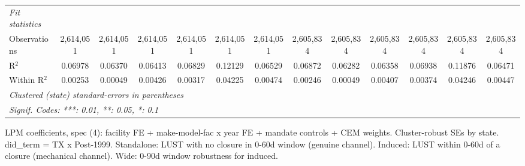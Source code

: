 \begin{tabular}{lcccccccccccc}
   \midrule
   \emph{Fit statistics}\\
   Observations                    & 2,614,051       & 2,614,051         & 2,614,051                & 2,614,051                     & 2,614,051              & 2,614,051                          & 2,605,834       & 2,605,834         & 2,605,834                & 2,605,834                     & 2,605,834              & 2,605,834\\  
   R$^2$                           & 0.06978         & 0.06370           & 0.06413                  & 0.06829                       & 0.12129                & 0.06529                            & 0.06872         & 0.06282           & 0.06358                  & 0.06938                       & 0.11876                & 0.06471\\  
   Within R$^2$                    & 0.00253         & 0.00049           & 0.00426                  & 0.00317                       & 0.04225                & 0.00474                            & 0.00246         & 0.00049           & 0.00407                  & 0.00374                       & 0.04246                & 0.00447\\  
   \midrule \midrule
   \multicolumn{13}{l}{\emph{Clustered (state) standard-errors in parentheses}}\\
   \multicolumn{13}{l}{\emph{Signif. Codes: ***: 0.01, **: 0.05, *: 0.1}}\\
\end{tabular}
 
\par \raggedright 
LPM coefficients, spec (4): facility FE + make-model-fac x year FE + mandate controls + CEM weights. Cluster-robust SEs by state. did\_term = TX x Post-1999. Standalone: LUST with no closure in 0-60d window (genuine channel). Induced: LUST within 0-60d of a closure (mechanical channel). Wide: 0-90d window robustness for induced.
\par\endgroup


